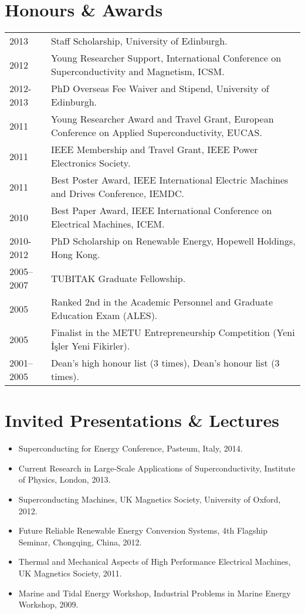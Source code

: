 \documentclass[a4paper,12pt]{article}
\begin{document}
\section{Honours \& Awards}
\begin{tabular}{lp{16cm}}
2013 & Staff Scholarship, University of Edinburgh. \\
2012 & Young Researcher Support, International Conference on Superconductivity and Magnetism, ICSM.\\ 
2012-2013 & PhD Overseas Fee Waiver and Stipend, University of Edinburgh. \\
2011 & Young Researcher Award and Travel Grant, European Conference on Applied Superconductivity, EUCAS.\\ 
2011 & IEEE Membership and Travel Grant, IEEE Power Electronics Society. \\ 
2011 & Best Poster Award, IEEE International Electric Machines and Drives Conference, IEMDC. \\
2010 & Best Paper Award, IEEE International Conference on Electrical Machines, ICEM. \\
2010-2012 & PhD Scholarship on Renewable Energy, Hopewell Holdings, Hong Kong. \\
2005--2007 & TUBITAK Graduate Fellowship. \\
2005 & Ranked 2nd in the Academic Personnel and Graduate Education Exam (ALES).\\
2005 & Finalist in the METU Entrepreneurship Competition (Yeni İşler Yeni Fikirler).\\
2001--2005 & Dean's high honour list (3 times), Dean's honour list (3 times). \\
\end{tabular}

\section{Invited Presentations \& Lectures}
\begin{itemize}
\item Superconducting for Energy Conference, Pasteum, Italy, 2014.
\item Current Research in Large-Scale Applications of Superconductivity, Institute of Physics, London, 2013.
\item Superconducting Machines, UK Magnetics Society, University of Oxford, 2012.
\item Future Reliable Renewable Energy Conversion Systems, 4th Flagship Seminar, Chongqing, China, 2012.
\item Thermal and Mechanical Aspects of High Performance Electrical Machines, UK Magnetics Society, 2011.
\item Marine and Tidal Energy Workshop, Industrial Problems in Marine Energy Workshop, 2009.
\end{itemize}
\end{document}
